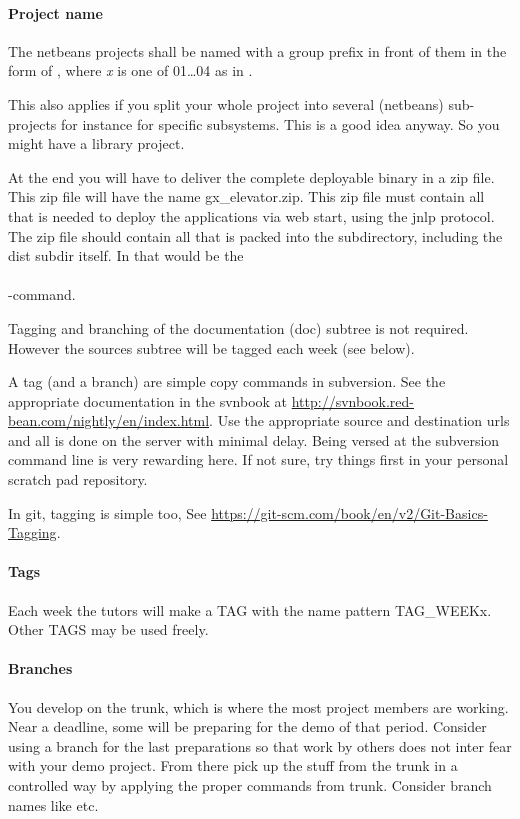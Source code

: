 \paragraph{Project name} The netbeans projects shall be named with a
group prefix in front of them in the form of , where \textit{x} is
one of 01\ldots04  as in .

This also applies if you split your whole project into several
(netbeans) sub-projects for instance for specific subsystems. This is
a good idea anyway. So you might have a  library
project.

At the end you will have to deliver the complete deployable binary in
a zip file. This zip file will have the name gx\_elevator.zip. This
zip file must contain all that is needed to deploy the applications
via web start, using the jnlp protocol. The zip file should contain all
that is packed into the  subdirectory, including the dist
subdir itself. In \Linux that would be the \\
\\
-command.

Tagging and branching of the documentation (doc) subtree is not required.
However the sources subtree will be tagged each week (see below).

A tag (and a branch) are simple copy commands in subversion. See the
appropriate documentation in the svnbook at
\url{http://svnbook.red-bean.com/nightly/en/index.html}. Use
the appropriate source and destination urls and all is done on the
server with minimal delay. Being versed at the subversion command line
is very rewarding here. If not sure, try things first in your
personal scratch pad repository.

In git, tagging is simple too, See \url{https://git-scm.com/book/en/v2/Git-Basics-Tagging}.

\paragraph{Tags} Each week the tutors will make a TAG with the name
pattern TAG\_WEEKx. Other TAGS may be used freely.

\paragraph{Branches} You develop on the trunk, which is where the most
project members are working. Near a deadline, some will be preparing
for the demo of that period. Consider using a branch for the last
preparations so that work by others does not inter fear with your demo
project. From there pick up the stuff from the trunk in a controlled
way by applying the proper  commands from trunk.
Consider branch names like  etc.

